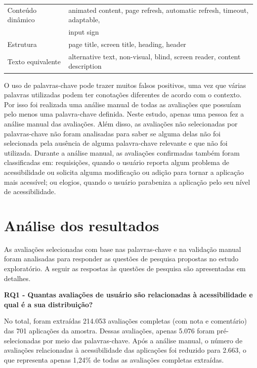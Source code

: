 \begin{table}[!htb]
\begin{tabular}{|l|l|}
\hline
Conteúdo dinâmico & animated content, page refresh, automatic  
refresh, timeout,  adaptable, \\&input sign                                                               \\

\hline
Estrutura                   & page title, screen title, heading, header                                                                                                         \\
\hline
Texto equivalente             & alternative text, non-visual, blind, screen reader, content description  \\
\hline
\end{tabular}
\end{table}

O uso de palavras-chave pode trazer muitos falsos positivos, uma vez que várias palavras utilizadas podem ter conotações diferentes de acordo com o contexto. Por isso foi realizada uma análise manual de todas as avaliações que possuíam pelo menos uma palavra-chave definida. Neste estudo, apenas uma pessoa fez a análise manual das avaliações. Além disso, as avaliações não selecionadas por palavras-chave não foram analisadas para saber se alguma delas não foi selecionada pela ausência de alguma palavra-chave relevante e que não foi utilizada. Durante a análise manual, as avaliações confirmadas também foram classificadas em: 
requisições, quando o usuário reporta algum problema de acessibilidade ou solicita alguma modificação ou adição para tornar a aplicação mais acessível;
ou elogios, quando o usuário parabeniza a aplicação pelo seu nível de acessibilidade.


\section{Análise dos resultados}

As avaliações selecionadas com base nas palavras-chave e na validação manual foram analisadas para responder as questões de pesquisa propostas no estudo exploratório. A seguir as respostas às questões de pesquisa são apresentadas em detalhes. 

 
\textbf{RQ1 - Quantas avaliações de usuário são relacionadas à acessibilidade e qual é a sua distribuição? }

No total, foram extraídas 214.053 avaliações completas (com nota e comentário) das 701 aplicações da amostra. 
Dessas avaliações, apenas 5.076 foram pré-selecionadas por meio das palavras-chave. 
Após a análise manual, o número de avaliações relacionadas à acessibilidade das aplicações foi reduzido para 2.663, o que representa apenas 1,24\% de todas as avaliações completas extraídas.

